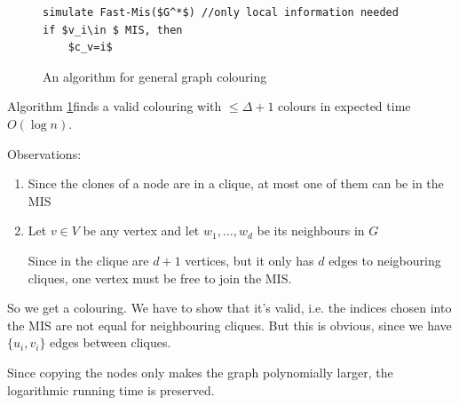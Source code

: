 \begin{figure}[hbt]
\begin{lstlisting}
simulate Fast-Mis($G^*$) //only local information needed
if $v_i\in $ MIS, then
	$c_v=i$ 
\end{lstlisting}
\caption{An algorithm for general graph colouring}
\label{alg:general_colouring}
\end{figure}

\begin{thm} Algorithm \ref{alg:general_colouring}finds a valid colouring with $\leq \Delta+1$ colours in expected time $O(\log n)$.\end{thm}

\begin{pr} Observations:

\begin{enumerate}
\item Since the clones of a node are in a clique, at most one of them can be in the MIS
\item Let $v\in V$ be any vertex and let $w_1,\ldots,w_d$ be its neighbours in $G$

Since in the clique are $d+1$ vertices, but it only has $d$ edges to neigbouring cliques, one vertex must be free to join the MIS.

\end{enumerate}

So we get a colouring. We have to show that it's valid, i.e. the indices chosen into the MIS are not equal for neighbouring cliques. But this is obvious, since we have $\{u_i,v_i\}$ edges between cliques.

Since copying the nodes only makes the graph polynomially larger, the logarithmic running time is preserved.
\end{pr}